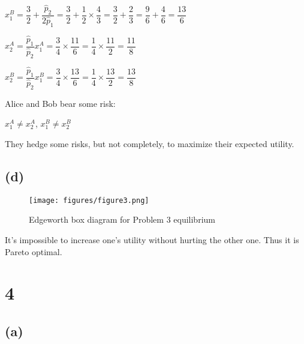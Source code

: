 \documentclass{article}
\begin{document}
$x^{B}_{1}=\dfrac{3}{2}+\dfrac{\hat{p}_{2}}{2\hat{p}_{1}}=\dfrac{3}{2}+\dfrac{1}{2}\times\dfrac{4}{3}=\dfrac{3}{2}+\dfrac{2}{3}=\dfrac{9}{6}+\dfrac{4}{6}=\dfrac{13}{6}$

$x^{A}_{2}=\dfrac{\hat{p}_{1}}{\hat{p}_{2}}x^{A}_{1}=\dfrac{3}{4}\times\dfrac{11}{6}=\dfrac{1}{4}\times\dfrac{11}{2}=\dfrac{11}{8}$

$x^{B}_{2}=\dfrac{\hat{p}_{1}}{\hat{p}_{2}}x^{B}_{1}=\dfrac{3}{4}\times\dfrac{13}{6}=\dfrac{1}{4}\times\dfrac{13}{2}=\dfrac{13}{8}$

Alice and Bob bear some risk: 

$x^{A}_{1}\neq x^{A}_{2}$, $x^{B}_{1}\neq x^{B}_{2}$

They hedge some risks, but not completely, to maximize their expected utility.

\subsection*{(d)}

\begin{figure}[H]
    \begin{center}
        \texttt{[image: figures/figure3.png]}
    \end{center}
    \caption{Edgeworth box diagram for Problem 3 equilibrium}
    \label{fig:graph}
\end{figure}

It's impossible to increase one's utility without hurting the other one. Thus it is Pareto optimal.

\section*{4}

\subsection*{(a)}

\end{document}
